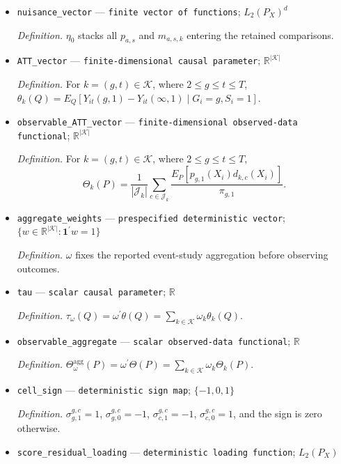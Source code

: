\documentclass{article}
\begin{document}
\begin{itemize}
  \item \texttt{nuisance\_\allowbreak{}vector} --- \texttt{finite vector of functions}; \(L_2(P_X)^d\)
  \par\smallskip\noindent\emph{Definition.} \(\eta_0\) stacks all \(p_{a,s}\) and \(m_{a,s,k}\) entering the retained comparisons.
  \item \texttt{ATT\_\allowbreak{}vector} --- \texttt{finite-\allowbreak{}dimensional causal parameter}; \(\mathbb R^{|\mathcal K|}\)
  \par\smallskip\noindent\emph{Definition.} For \(k=(g,t)\in\mathcal K\), where \(2\le g\le t\le T\), \(\theta_k(Q)=E_Q[Y_{it}(g,1)-Y_{it}(\infty,1)\mid G_i=g,S_i=1]\).
  \item \texttt{observable\_\allowbreak{}ATT\_\allowbreak{}vector} --- \texttt{finite-\allowbreak{}dimensional observed-\allowbreak{}data functional}; \(\mathbb R^{|\mathcal K|}\)
  \par\smallskip\noindent\emph{Definition.} For \(k=(g,t)\in\mathcal K\), where \(2\le g\le t\le T\), \[\Theta_k(P)=\frac{1}{|\mathcal J_k|}\sum_{c\in\mathcal J_k}\frac{E_P[p_{g,1}(X_i)d_{k,c}(X_i)]}{\pi_{g,1}}.\]
  \item \texttt{aggregate\_\allowbreak{}weights} --- \texttt{prespecified deterministic vector}; \(\{w\in\mathbb R^{|\mathcal K|}:\mathbf 1^{\prime}w=1\}\)
  \par\smallskip\noindent\emph{Definition.} \(\omega\) fixes the reported event-study aggregation before observing outcomes.
  \item \texttt{tau} --- \texttt{scalar causal parameter}; \(\mathbb R\)
  \par\smallskip\noindent\emph{Definition.} \(\tau_\omega(Q)=\omega^{\prime}\theta(Q)=\sum_{k\in\mathcal K}\omega_k\theta_k(Q)\).
  \item \texttt{observable\_\allowbreak{}aggregate} --- \texttt{scalar observed-\allowbreak{}data functional}; \(\mathbb R\)
  \par\smallskip\noindent\emph{Definition.} \(\Theta_\omega^{\mathrm{agg}}(P)=\omega^{\prime}\Theta(P)=\sum_{k\in\mathcal K}\omega_k\Theta_k(P)\).
  \item \texttt{cell\_\allowbreak{}sign} --- \texttt{deterministic sign map}; \(\{-1,0,1\}\)
  \par\smallskip\noindent\emph{Definition.} \(\sigma_{g,1}^{g,c}=1\), \(\sigma_{g,0}^{g,c}=-1\), \(\sigma_{c,1}^{g,c}=-1\), \(\sigma_{c,0}^{g,c}=1\), and the sign is zero otherwise.
  \item \texttt{score\_\allowbreak{}residual\_\allowbreak{}loading} --- \texttt{deterministic loading function}; \(L_2(P_X)\)

\end{itemize}
\end{document}
